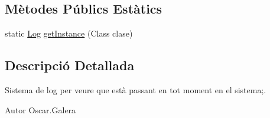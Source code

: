 \subsection*{Mètodes Públics Estàtics}
\begin{DoxyCompactItemize}
\item 
static \hyperlink{classlogica_1_1log_1_1_log}{Log} \hyperlink{classlogica_1_1log_1_1_log_ab38bea9cfc1ad368b40a2773f93d14b8}{get\+Instance} (Class clase)
\end{DoxyCompactItemize}


\subsection{Descripció Detallada}
Sistema de log per veure que està passant en tot moment en el sistema;. 

\begin{DoxyAuthor}{Autor}
Oscar.\+Galera 
\end{DoxyAuthor}


